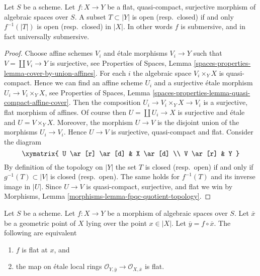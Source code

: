 \begin{lemma}
\label{lemma-fpqc-quotient-topology}
Let $S$ be a scheme.
Let $f : X \to Y$ be a flat, quasi-compact, surjective morphism of
algebraic spaces over $S$.
A subset $T \subset |Y|$ is open (resp.\ closed) if and only
$f^{-1}(|T|)$ is open (resp.\ closed) in $|X|$.
In other words $f$ is submersive, and in fact universally submersive.
\end{lemma}

\begin{proof}
Choose affine schemes $V_i$ and \'etale morphisms $V_i \to Y$ such that
$V = \coprod V_i \to Y$ is surjective, see
Properties of Spaces,
Lemma \ref{spaces-properties-lemma-cover-by-union-affines}.
For each $i$ the algebraic space $V_i \times_Y X$ is quasi-compact.
Hence we can find an affine scheme $U_i$ and a surjective \'etale morphism
$U_i \to V_i \times_Y X$, see
Properties of Spaces,
Lemma \ref{spaces-properties-lemma-quasi-compact-affine-cover}.
Then the composition $U_i \to V_i \times_Y X \to V_i$ is a surjective,
flat morphism of affines.
Of course then $U = \coprod U_i \to X$ is surjective and \'etale
and $U = V \times_Y X$. Moreover, the morphism $U \to V$ is the
disjoint union of the morphisms $U_i \to V_i$. Hence $U \to V$ is surjective,
quasi-compact and flat. Consider the diagram
$$
\xymatrix{
U \ar[r] \ar[d] & X \ar[d] \\
V \ar[r] & Y
}
$$
By definition of the topology on $|Y|$ the set $T$ is closed
(resp.\ open) if and only if $g^{-1}(T) \subset |V|$ is closed
(resp.\ open). The same holds for
$f^{-1}(T)$ and its inverse image in $|U|$.
Since $U \to V$ is quasi-compact, surjective,  and flat we win by
Morphisms, Lemma \ref{morphisms-lemma-fpqc-quotient-topology}.
\end{proof}

\begin{lemma}
\label{lemma-flat-at-point-etale-local-rings}
Let $S$ be a scheme.
Let $f : X \to Y$ be a morphism of algebraic spaces over $S$.
Let $\overline{x}$ be a geometric point of $X$ lying over the point
$x \in |X|$. Let $\overline{y} = f \circ \overline{x}$. The following
are equivalent
\begin{enumerate}
\item $f$ is flat at $x$, and
\item the map on \'etale local rings
$\mathcal{O}_{Y, \overline{y}} \to \mathcal{O}_{X, \overline{x}}$
is flat.
\end{enumerate}
\end{lemma}

